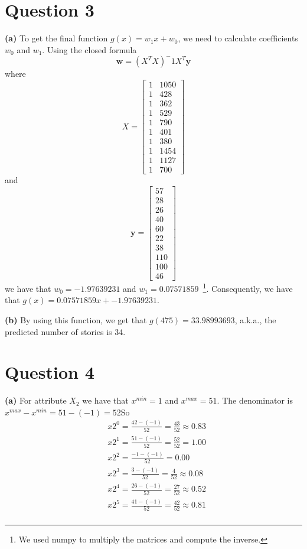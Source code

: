 \documentclass[leqno]{article}
\begin{document}
\section*{Question 3} \textbf{(a)} To get the final function $g(x) = w_1x + w_0$, we need to calculate coefficients $w_0$ and $w_1$. Using the closed 
formula
\begin{equation*}
\textbf{w} = (X^TX)^-1X^T\textbf{y}
\end{equation*}
where 
\[
X=
  \begin{bmatrix}
    1 & 1050\\
    1 & 428\\
    1 & 362\\
    1 & 529\\
    1 & 790\\
    1 & 401\\
    1 & 380\\
    1 & 1454\\
    1 & 1127\\
    1 & 700
  \end{bmatrix}
\]
and
\[
\textbf{y}=
  \begin{bmatrix}
     57\\
     28\\
     26\\
     40\\
     60\\
     22\\
     38\\
     110\\
     100\\
     46
  \end{bmatrix}
\]
we have that $w_0 = -1.97639231$ and $w_1 = 0.07571859$~\footnote{We used numpy to multiply the matrices and compute the inverse.}.
 Consequently, we have that $g(x) = 0.07571859x + -1.97639231$.

\hfill

\textbf{(b)} By using this function, we get that $g(475) = 33.98993693$, a.k.a., the predicted number of stories is 34.

\hfill

\section*{Question 4} \textbf{(a)} For attribute $X_2$ we have that $x^{min} = 1$ and $x^{max} = 51$. The denominator is 
$x^{max} - x^{min} = 51 - (-1) = 52$So
\begin{equation*}
\begin{split}
&x2^0 = \frac{42 - (-1)}{52} = \frac{43}{52} \approx 0.83 \\
&x2^1 = \frac{51 - (-1)}{52} = \frac{52}{52} = 1.00\\
&x2^2 = \frac{-1 - (-1)}{52} = 0.00\\
&x2^3 = \frac{3 - (-1)}{52} = \frac{4}{52} \approx 0.08\\
&x2^4 = \frac{26 - (-1)}{52} = \frac{27}{52} \approx 0.52\\
&x2^5 = \frac{41 - (-1)}{52} = \frac{42}{52} \approx 0.81\\ 
\end{split}
\end{equation*} 
\end{document}
